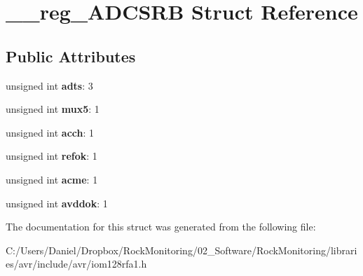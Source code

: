 \hypertarget{struct____reg___a_d_c_s_r_b}{}\section{\+\_\+\+\_\+reg\+\_\+\+A\+D\+C\+S\+RB Struct Reference}
\label{struct____reg___a_d_c_s_r_b}
\subsection*{Public Attributes}
\begin{DoxyCompactItemize}
\item 
unsigned int {\bfseries adts}\+: 3\hypertarget{struct____reg___a_d_c_s_r_b_aca204b874f8c78f8c7c0597e99f194bd}{}\label{struct____reg___a_d_c_s_r_b_aca204b874f8c78f8c7c0597e99f194bd}

\item 
unsigned int {\bfseries mux5}\+: 1\hypertarget{struct____reg___a_d_c_s_r_b_a5c997e205ad6e08d8aefe0e4d664ae40}{}\label{struct____reg___a_d_c_s_r_b_a5c997e205ad6e08d8aefe0e4d664ae40}

\item 
unsigned int {\bfseries acch}\+: 1\hypertarget{struct____reg___a_d_c_s_r_b_af95364b0f926587059f7cb692186c185}{}\label{struct____reg___a_d_c_s_r_b_af95364b0f926587059f7cb692186c185}

\item 
unsigned int {\bfseries refok}\+: 1\hypertarget{struct____reg___a_d_c_s_r_b_a10c1abc8d5bd81a7cbe11280a034fa6e}{}\label{struct____reg___a_d_c_s_r_b_a10c1abc8d5bd81a7cbe11280a034fa6e}

\item 
unsigned int {\bfseries acme}\+: 1\hypertarget{struct____reg___a_d_c_s_r_b_ab531ed6385879b624bce903caa0fa0eb}{}\label{struct____reg___a_d_c_s_r_b_ab531ed6385879b624bce903caa0fa0eb}

\item 
unsigned int {\bfseries avddok}\+: 1\hypertarget{struct____reg___a_d_c_s_r_b_ac9643c9098a7c5074fbbcc1d06496208}{}\label{struct____reg___a_d_c_s_r_b_ac9643c9098a7c5074fbbcc1d06496208}

\end{DoxyCompactItemize}


The documentation for this struct was generated from the following file\+:\begin{DoxyCompactItemize}
\item 
C\+:/\+Users/\+Daniel/\+Dropbox/\+Rock\+Monitoring/02\+\_\+\+Software/\+Rock\+Monitoring/libraries/avr/include/avr/iom128rfa1.\+h\end{DoxyCompactItemize}
